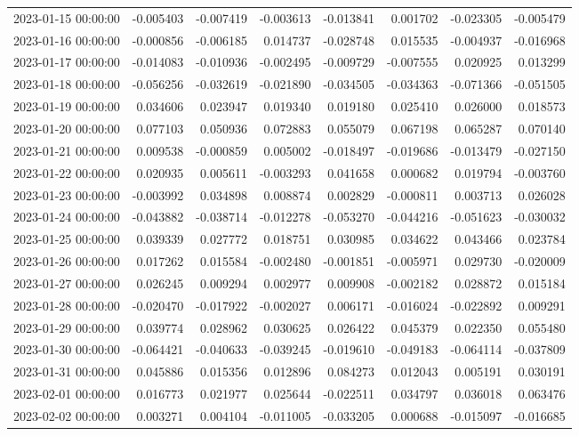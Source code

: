 \begin{tabular}{lrrrrrrr}
2023-01-15 00:00:00 & -0.005403 & -0.007419 & -0.003613 & -0.013841 & 0.001702 & -0.023305 & -0.005479 \\
2023-01-16 00:00:00 & -0.000856 & -0.006185 & 0.014737 & -0.028748 & 0.015535 & -0.004937 & -0.016968 \\
2023-01-17 00:00:00 & -0.014083 & -0.010936 & -0.002495 & -0.009729 & -0.007555 & 0.020925 & 0.013299 \\
2023-01-18 00:00:00 & -0.056256 & -0.032619 & -0.021890 & -0.034505 & -0.034363 & -0.071366 & -0.051505 \\
2023-01-19 00:00:00 & 0.034606 & 0.023947 & 0.019340 & 0.019180 & 0.025410 & 0.026000 & 0.018573 \\
2023-01-20 00:00:00 & 0.077103 & 0.050936 & 0.072883 & 0.055079 & 0.067198 & 0.065287 & 0.070140 \\
2023-01-21 00:00:00 & 0.009538 & -0.000859 & 0.005002 & -0.018497 & -0.019686 & -0.013479 & -0.027150 \\
2023-01-22 00:00:00 & 0.020935 & 0.005611 & -0.003293 & 0.041658 & 0.000682 & 0.019794 & -0.003760 \\
2023-01-23 00:00:00 & -0.003992 & 0.034898 & 0.008874 & 0.002829 & -0.000811 & 0.003713 & 0.026028 \\
2023-01-24 00:00:00 & -0.043882 & -0.038714 & -0.012278 & -0.053270 & -0.044216 & -0.051623 & -0.030032 \\
2023-01-25 00:00:00 & 0.039339 & 0.027772 & 0.018751 & 0.030985 & 0.034622 & 0.043466 & 0.023784 \\
2023-01-26 00:00:00 & 0.017262 & 0.015584 & -0.002480 & -0.001851 & -0.005971 & 0.029730 & -0.020009 \\
2023-01-27 00:00:00 & 0.026245 & 0.009294 & 0.002977 & 0.009908 & -0.002182 & 0.028872 & 0.015184 \\
2023-01-28 00:00:00 & -0.020470 & -0.017922 & -0.002027 & 0.006171 & -0.016024 & -0.022892 & 0.009291 \\
2023-01-29 00:00:00 & 0.039774 & 0.028962 & 0.030625 & 0.026422 & 0.045379 & 0.022350 & 0.055480 \\
2023-01-30 00:00:00 & -0.064421 & -0.040633 & -0.039245 & -0.019610 & -0.049183 & -0.064114 & -0.037809 \\
2023-01-31 00:00:00 & 0.045886 & 0.015356 & 0.012896 & 0.084273 & 0.012043 & 0.005191 & 0.030191 \\
2023-02-01 00:00:00 & 0.016773 & 0.021977 & 0.025644 & -0.022511 & 0.034797 & 0.036018 & 0.063476 \\
2023-02-02 00:00:00 & 0.003271 & 0.004104 & -0.011005 & -0.033205 & 0.000688 & -0.015097 & -0.016685 \\

\end{tabular}
